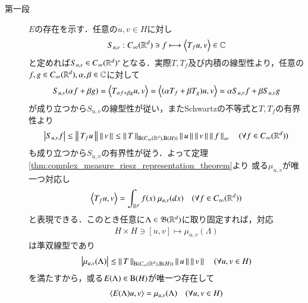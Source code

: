 	\begin{prf}\mbox{}
		\begin{description}
			\item[第一段]
				$E$の存在を示す．任意の$u,v \in H$に対し
				\begin{align}
					S_{u,v}:\cvan{\R^d} \ni f \longmapsto \inprod<T_f u,v> \in \C
				\end{align}
				と定めれば$S_{u,v} \in C_\infty (\mathbb{R}^d)^*$となる．実際$T,T_f$及び内積の線型性より，任意の$f,g \in C_\infty (\mathbb{R}^d),\alpha,\beta \in \mathbb{C}$に対して
				\begin{align}
					S_{u,v} (\alpha f + \beta g) = \inprod<T_{\alpha f + \beta g} u,v>
					= \inprod<(\alpha T_f + \beta T_g) u,v>
					= \alpha S_{u,v} f + \beta S_{u,v} g
				\end{align}
				が成り立つから$S_{u,v}$の線型性が従い，またSchwartzの不等式と$T,T_f$の有界性より
				\begin{align}
					\left| S_{u,v}f \right| \leq \left\|\, T_f u\, \right\|_{} \left\|\, v\, \right\|_{} \leq \left\|\, T\, \right\|_{\mathrm{B}(C_\infty (\mathbb{R}^d),\mathrm{B}(H) ) } \left\|\, u\, \right\|_{} \left\|\, v\, \right\|_{} \left\|\, f\, \right\|_{\infty}
					\quad (\forall f \in C_\infty (\mathbb{R}^d))
					\label{eq:thm_spectral_decomposition_of_bounded_linear_operators_5}
				\end{align}
				も成り立つから$S_{u,v}$の有界性が従う．よって定理\ref{thm:complex_measure_riesz_representation_theorem}より
				或る$\mu_{u,v}$が唯一つ対応し
				\begin{align}
					\inprod<T_f u,v> = \int_{\R^d} f(x)\ \mu_{u,v}(dx) \quad (\forall f \in \cvan{\R^d})
					\label{eq:thm_spectral_decomposition_of_bounded_linear_operators_3}
				\end{align}
				と表現できる．このとき任意に$\Lambda \in \mathfrak{B}(\mathbb{R}^d)$に取り固定すれば，対応
				\begin{align}
					H \times H \ni [u,v] \longmapsto \mu_{u,v}(\Lambda)
					\label{eq:thm_spectral_decomposition_of_bounded_linear_operators_1}
				\end{align}
				は準双線型であり
				\begin{align}
					\left| \mu_{u,v}(\Lambda) \right| \leq \left\|\, T\, \right\|_{\mathrm{B}(C_\infty (\mathbb{R}^d),\mathrm{B}(H) ) } \left\|\, u\, \right\|_{} \left\|\, v\, \right\|_{}
					\quad (\forall u,v \in H)
					\label{eq:thm_spectral_decomposition_of_bounded_linear_operators_2}
				\end{align}
				を満たすから，或る$E(\Lambda) \in \mathrm{B}(H) $が唯一つ存在して
				\begin{align}
					\inprod<E(\Lambda) u, v> = \mu_{u,v}(\Lambda) \quad (\forall u,v \in H)
					\label{eq:thm_spectral_decomposition_of_bounded_linear_operators_6}

\end{align}
\end{description}
\end{prf}
